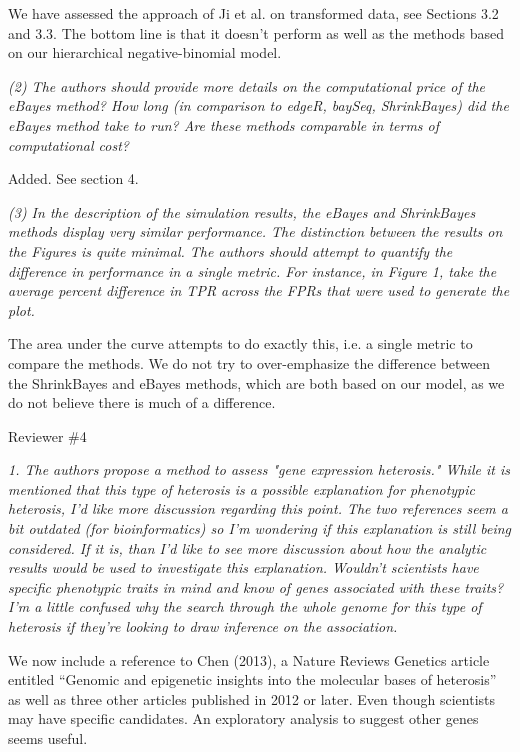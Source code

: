 \documentclass{article}
\newcommand{\comment}[1]{\textit{#1}}
\newcommand{\response}[1]{#1}
\begin{document}
\response{We have assessed the approach of Ji et al. on transformed data, see Sections 3.2 and 3.3. The bottom line is that it doesn't perform as well as the methods based on our hierarchical negative-binomial model.}

\comment{(2) The authors should provide more details on the computational price of the eBayes method? How long (in comparison to edgeR, baySeq, ShrinkBayes) did the eBayes method take to run? Are these methods comparable in terms of computational cost?}

\response{Added. See section 4.}

\comment{(3) In the description of the simulation results, the eBayes and ShrinkBayes methods display very similar performance. The distinction between the results on the Figures is quite minimal. The authors should attempt to quantify the difference in performance in a single metric. For instance, in Figure 1, take the average percent difference in TPR across the FPRs that were used to generate the plot.}

\response{The area under the curve attempts to do exactly this, i.e. a single metric to compare the methods. We do not try to over-emphasize the difference between the ShrinkBayes and eBayes methods, which are both based on our model, as we do not believe there is much of a difference.}



Reviewer \#4

\comment{1. The authors propose a method to assess "gene expression heterosis."   While it is mentioned that this type of heterosis is a possible explanation for phenotypic heterosis, I'd like more discussion regarding this point.  The two references seem a bit outdated (for bioinformatics) so I'm wondering if this explanation is still being considered.  If it is, than I'd like to see more discussion about how the analytic results would be used to investigate this explanation.   Wouldn't scientists have specific phenotypic traits in mind and know of genes associated with these traits?  I'm a little confused why the search through the whole genome for this type of heterosis if they're looking to draw inference on the association.}

\response{We now include a reference to Chen (2013), a Nature Reviews Genetics article entitled ``Genomic and epigenetic insights into the molecular bases of heterosis'' as well as three other articles published in 2012 or later. Even though scientists may have specific candidates. An exploratory analysis to suggest other genes seems useful.} 
\end{document}
